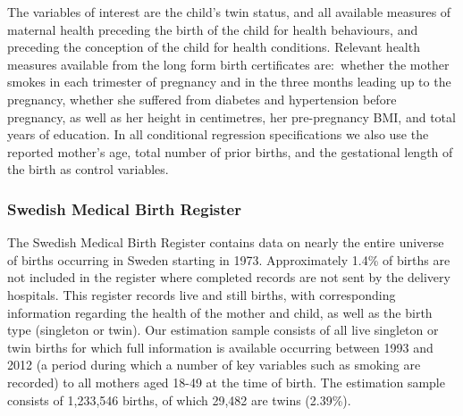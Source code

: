 \documentclass{nature}
\begin{document}
\begin{linenumbers}
The variables of interest are the child's twin status, and all available measures of maternal health preceding the birth of the child for health behaviours, and preceding the conception of the child for health conditions.  %
 Relevant health measures available from the long form birth certificates are:\ whether the mother smokes in each trimester of pregnancy and in the three months leading up to the pregnancy, whether she suffered from diabetes and hypertension before pregnancy, as well as her height in centimetres, her pre-pregnancy BMI, and total years of education. 
  In all conditional regression specifications we also use the reported mother's age, total number of prior births, and the gestational length of the birth as control variables\cite{Hall2003}.  %
  


\subsubsection{Swedish Medical Birth Register}
The Swedish Medical Birth Register contains data on nearly the entire universe of births occurring in Sweden starting in 1973\cite{EPC2003}.  Approximately 1.4\% of births are not included in the register where completed records are not sent by the delivery hospitals\cite{EPC2003}.  This register records live and still births, with corresponding information regarding the health of the mother and child, as well as the birth type (singleton or twin).  Our estimation sample consists of all live singleton or twin births for which full information is available occurring between 1993 and 2012 (a period during which a number of key variables such as smoking are recorded) to all mothers aged 18-49 at the time of birth.  The estimation sample consists of 1,233,546 births, of which 29,482 are twins (2.39\%). 


\end{linenumbers}
\end{document}
